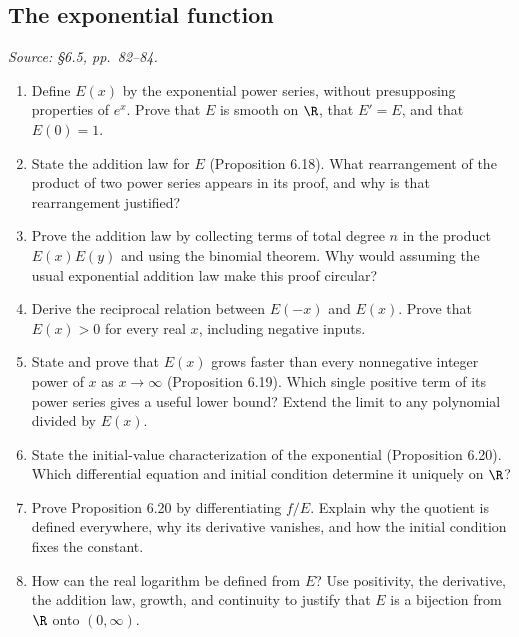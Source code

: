 \subsection{The exponential function}
\textit{Source: \S6.5, pp.~82--84.}

\begin{enumerate}[resume]
  \item Define \(E(x)\) by the exponential power series, without
    presupposing properties of \(e^x\). Prove that \(E\) is smooth
    on \(\R\), that \(E'=E\), and that \(E(0)=1\).

  \item State the addition law for \(E\) (Proposition 6.18).
    What rearrangement of the product of two power series appears
    in its proof, and why is that rearrangement justified?

  \item Prove the addition law by collecting terms of total degree
    \(n\) in the product \(E(x)E(y)\) and using the binomial theorem.
    Why would assuming the usual exponential addition law make
    this proof circular?

  \item Derive the reciprocal relation between \(E(-x)\) and \(E(x)\).
    Prove that \(E(x)>0\) for every real \(x\), including negative inputs.

  \item State and prove that \(E(x)\) grows faster than every
    nonnegative integer power of \(x\) as \(x\to\infty\)
    (Proposition 6.19). Which single positive term of its power
    series gives a useful lower bound? Extend the limit to any
    polynomial divided by \(E(x)\).

  \item State the initial-value characterization of the exponential
    (Proposition 6.20). Which differential equation and initial
    condition determine it uniquely on \(\R\)?

  \item Prove Proposition 6.20 by differentiating \(f/E\).
    Explain why the quotient is defined everywhere, why its
    derivative vanishes, and how the initial condition fixes the constant.

  \item How can the real logarithm be defined from \(E\)?
    Use positivity, the derivative, the addition law, growth,
    and continuity to justify that \(E\) is a bijection from
    \(\R\) onto \((0,\infty)\).
\end{enumerate}

